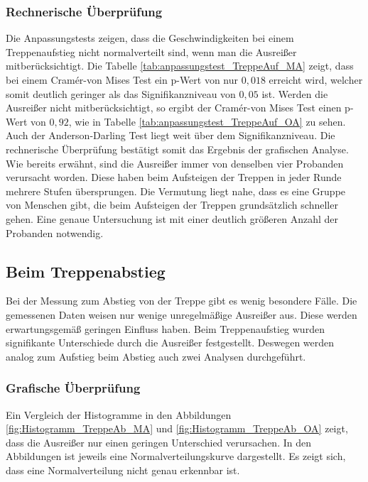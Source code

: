 \subsubsection{Rechnerische Überprüfung}
Die Anpassungstests zeigen, dass die Geschwindigkeiten bei einem Treppenaufstieg nicht normalverteilt sind, wenn man die Ausreißer mitberücksichtigt. Die Tabelle \ref{tab:anpassungstest_TreppeAuf_MA} zeigt, dass bei einem Cram{\' e}r-von Mises Test ein p-Wert von nur $0,018$ erreicht wird, welcher somit deutlich geringer als das Signifikanzniveau von $0,05$ ist. Werden die Ausreißer nicht mitberücksichtigt, so ergibt der Cram{\' e}r-von Mises Test einen p-Wert von $0,92$, wie in Tabelle \ref{tab:anpassungstest_TreppeAuf_OA} zu sehen. Auch der Anderson-Darling Test liegt weit über dem Signifikanzniveau. Die rechnerische Überprüfung bestätigt somit das Ergebnis der grafischen Analyse. Wie bereits erwähnt, sind die Ausreißer immer von denselben vier Probanden verursacht worden. Diese haben beim Aufsteigen der Treppen in jeder Runde mehrere Stufen übersprungen. Die Vermutung liegt nahe, dass es eine Gruppe von Menschen gibt, die beim Aufsteigen der Treppen grundsätzlich schneller gehen. Eine genaue Untersuchung ist mit einer deutlich größeren Anzahl der Probanden notwendig.


\subsection{Beim Treppenabstieg}

Bei der Messung zum Abstieg von der Treppe gibt es wenig besondere Fälle. Die gemessenen Daten weisen nur wenige unregelmäßige Ausreißer aus. Diese werden erwartungsgemäß geringen Einfluss haben. Beim Treppenaufstieg wurden signifikante Unterschiede durch 
die Ausreißer festgestellt. Deswegen werden analog zum Aufstieg beim Abstieg auch zwei Analysen durchgeführt.



\subsubsection{Grafische Überprüfung}
Ein Vergleich der Histogramme in den Abbildungen \ref{fig:Histogramm_TreppeAb_MA} und \ref{fig:Histogramm_TreppeAb_OA} zeigt, dass die Ausreißer nur einen geringen Unterschied verursachen. In den Abbildungen ist jeweils eine Normalverteilungskurve dargestellt. Es zeigt sich, dass eine Normalverteilung nicht genau erkennbar ist.

